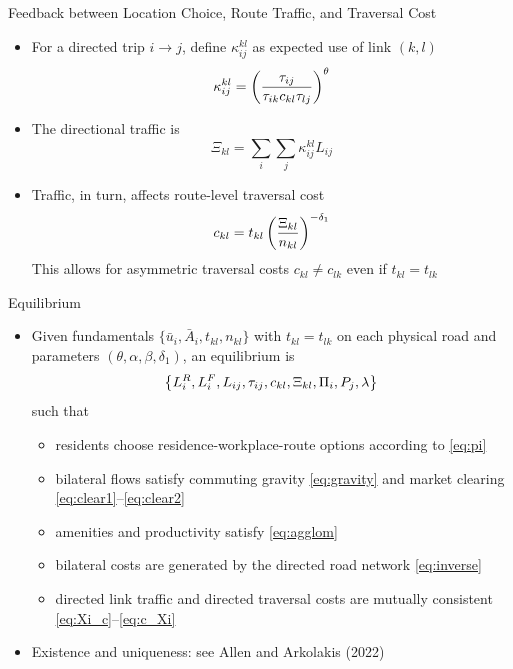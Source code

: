 \documentclass[11pt,aspectratio=169]{beamer}
\begin{document}
\begin{frame}{Feedback between Location Choice, Route Traffic, and Traversal Cost}
\begin{itemize}
  \item For a directed trip $i\to j$, define $\kappa^{kl}_{ij}$ as expected use of link $(k,l)$
  \vspace{-1em}\begin{equation}
    \kappa^{kl}_{ij} = \left( \frac{\tau_{ij}} {\tau_{ik}c_{kl}\tau_{lj}} \right)^\theta 
  \vspace{-0.5em}\end{equation}
  \item The directional traffic is
  \begin{equation}\label{eq:Xi_c}
  \Xi_{kl} = \sum_i\sum_j \kappa^{kl}_{ij}L_{ij}
  \end{equation}
  \item Traffic, in turn, affects route-level traversal cost
  \vspace{-0.5em}\begin{equation}\label{eq:c_Xi}
    c_{kl} = t_{kl} \left(\frac{\Xi_{kl}}{n_{kl}}\right)^{-\delta_1}
  \vspace{-0.5em}\end{equation}
    This allows for asymmetric traversal costs $c_{kl}\neq c_{lk}$ even if $t_{kl}=t_{lk}$
  \end{itemize}
\end{frame}

\begin{frame}{Equilibrium}
\begin{itemize}
  \item Given fundamentals $\{\bar u_i,\bar A_i,t_{kl},n_{kl}\}$ with $t_{kl}=t_{lk}$ on each physical road and parameters $(\theta,\alpha,\beta,\delta_1)$, an equilibrium is
  \vspace{-0.5em}\begin{equation}
    \left\{L_i^R,L_i^F,L_{ij},\tau_{ij},c_{kl},\Xi_{kl},\Pi_i,P_j,\lambda\right\}
  \vspace{-0.5em}\end{equation}
  such that
  \begin{itemize}
    \item residents choose residence-workplace-route options according to \eqref{eq:pi}
    \item bilateral flows satisfy commuting gravity \eqref{eq:gravity} and market clearing \eqref{eq:clear1}--\eqref{eq:clear2} 
    \item amenities and productivity satisfy \eqref{eq:agglom}
    \item bilateral costs are generated by the directed road network \eqref{eq:inverse}
    \item directed link traffic and directed traversal costs are mutually consistent \eqref{eq:Xi_c}--\eqref{eq:c_Xi}
  \end{itemize}
  \item Existence and uniqueness: see Allen and Arkolakis (2022)
\end{itemize}
\end{frame}
\end{document}
